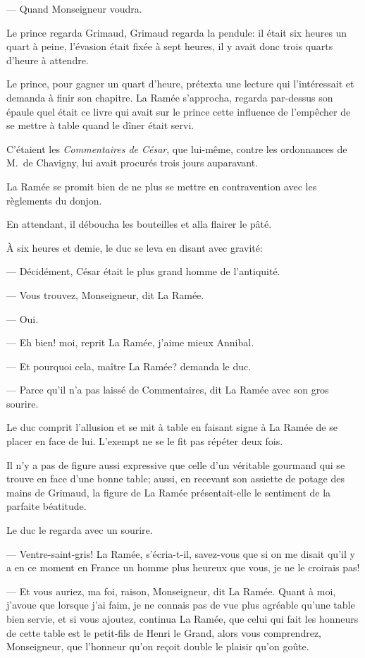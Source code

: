 — Quand Monseigneur voudra.

Le prince regarda Grimaud, Grimaud regarda la pendule: il était six heures un quart à peine, l'évasion était fixée à sept heures, il y avait donc trois quarts d'heure à attendre.

Le prince, pour gagner un quart d'heure, prétexta une lecture qui l'intéressait et demanda à finir son chapitre. La Ramée s'approcha, regarda par-dessus son épaule quel était ce livre qui avait sur le prince cette influence de l'empêcher de se mettre à table quand le dîner était servi.

C'étaient les \textit{Commentaires de César}, que lui-même, contre les ordonnances de M.~de Chavigny, lui avait procurés trois jours auparavant.

La Ramée se promit bien de ne plus se mettre en contravention avec les règlements du donjon.

En attendant, il déboucha les bouteilles et alla flairer le pâté.

À six heures et demie, le duc se leva en disant avec gravité:

— Décidément, César était le plus grand homme de l'antiquité.

— Vous trouvez, Monseigneur, dit La Ramée.

— Oui.

— Eh bien! moi, reprit La Ramée, j'aime mieux Annibal.

— Et pourquoi cela, maître La Ramée? demanda le duc.

— Parce qu'il n'a pas laissé de Commentaires, dit La Ramée avec son gros sourire.

Le duc comprit l'allusion et se mit à table en faisant signe à La Ramée de se placer en face de lui.
L'exempt ne se le fit pas répéter deux fois.

Il n'y a pas de figure aussi expressive que celle d'un véritable gourmand qui se trouve en face d'une bonne table; aussi, en recevant son assiette de potage des mains de Grimaud, la figure de La Ramée présentait-elle le sentiment de la parfaite béatitude.

Le duc le regarda avec un sourire.

— Ventre-saint-gris! La Ramée, s'écria-t-il, savez-vous que si on me disait qu'il y a en ce moment en France un homme plus heureux que vous, je ne le croirais pas!

— Et vous auriez, ma foi, raison, Monseigneur, dit La Ramée. Quant à moi, j'avoue que lorsque j'ai faim, je ne connais pas de vue plus agréable qu'une table bien servie, et si vous ajoutez, continua La Ramée, que celui qui fait les honneurs de cette table est le petit-fils de Henri le Grand, alors vous comprendrez, Monseigneur, que l'honneur qu'on reçoit double le plaisir qu'on goûte.

